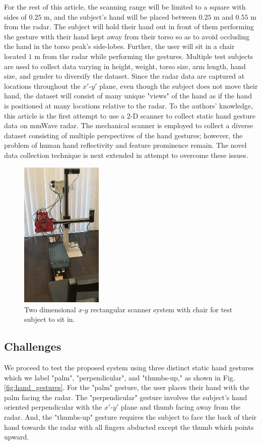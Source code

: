 \documentclass{ieeeaccess}
\begin{document}
For the rest of this article, the scanning range will be limited to a square with sides of $0.25$ m, and the subject's hand will be placed between $0.25$ m and $0.55$ m from the radar. The subject will hold their hand out in front of them performing the gesture with their hand kept away from their torso so as to avoid occluding the hand in the torso peak's side-lobes. Further, the user will sit in a chair located $1$ m from the radar while performing the gestures. Multiple test subjects are used to collect data varying in height, weight, torso size, arm length, hand size, and gender to diversify the dataset. Since the radar data are captured at locations throughout the $x'$-$y'$ plane, even though the subject does not move their hand, the dataset will consist of many unique "views" of the hand as if the hand is positioned at many locations relative to the radar. To the authors' knowledge, this article is the first attempt to use a 2-D scanner to collect static hand gesture data on mmWave radar. The mechanical scanner is employed to collect a diverse dataset consisting of multiple perspectives of the hand gestures; however, the problem of human hand reflectivity and feature prominence remain. The novel data collection technique is next extended in attempt to overcome these issues.

\begin{figure}[h]
    \centering
    \includegraphics[width=0.35\textwidth]{scanner_photo.jpg}
    \caption{Two dimensional $x$-$y$ rectangular scanner system with chair for test subject to sit in.}
    \label{fig:xy_scanner_pic}
\end{figure}

\subsection{Challenges}
\label{subsec:challenges}
We proceed to test the proposed system using three distinct static hand gestures which we label "palm", "perpendicular", and "thumbs-up," as shown in Fig. \ref{fig:hand_gestures}. For the "palm" gesture, the user places their hand with the palm facing the radar. The "perpendicular" gesture involves the subject's hand oriented perpendicular with the $x'$-$y'$ plane and thumb facing away from the radar. And, the "thumbs-up" gesture requires the subject to face the back of their hand towards the radar with all fingers abducted except the thumb which points upward. 
\end{document}
